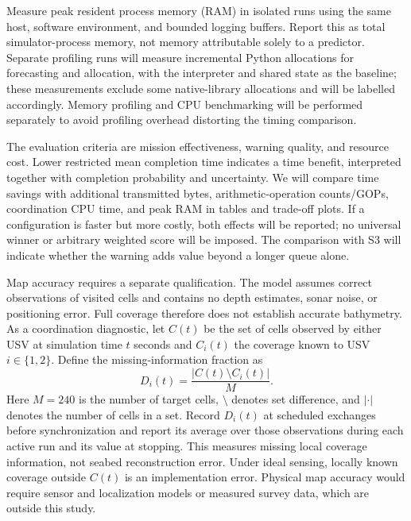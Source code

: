 Measure peak resident process memory (RAM) in isolated runs using the same host, software environment, and bounded logging buffers. Report this as total simulator-process memory, not memory attributable solely to a predictor. Separate profiling runs will measure incremental Python allocations for forecasting and allocation, with the interpreter and shared state as the baseline; these measurements exclude some native-library allocations and will be labelled accordingly. Memory profiling and CPU benchmarking will be performed separately to avoid profiling overhead distorting the timing comparison.

The evaluation criteria are mission effectiveness, warning quality, and resource cost. Lower restricted mean completion time indicates a time benefit, interpreted together with completion probability and uncertainty. We will compare time savings with additional transmitted bytes, arithmetic-operation counts/GOPs, coordination CPU time, and peak RAM in tables and trade-off plots. If a configuration is faster but more costly, both effects will be reported; no universal winner or arbitrary weighted score will be imposed. The comparison with S3 will indicate whether the warning adds value beyond a longer queue alone.

Map accuracy requires a separate qualification. The model assumes correct observations of visited cells and contains no depth estimates, sonar noise, or positioning error. Full coverage therefore does not establish accurate bathymetry. As a coordination diagnostic, let $C(t)$ be the set of cells observed by either USV at simulation time $t$ seconds and $C_i(t)$ the coverage known to USV $i\in\{1,2\}$. Define the missing-information fraction as
\begin{equation}
\label{eq:missing-coverage}
D_i(t)=\frac{|C(t)\setminus C_i(t)|}{M}.
\end{equation}
Here $M=240$ is the number of target cells, $\setminus$ denotes set difference, and $|\cdot|$ denotes the number of cells in a set. Record $D_i(t)$ at scheduled exchanges before synchronization and report its average over those observations during each active run and its value at stopping. This measures missing local coverage information, not seabed reconstruction error. Under ideal sensing, locally known coverage outside $C(t)$ is an implementation error. Physical map accuracy would require sensor and localization models or measured survey data, which are outside this study.


